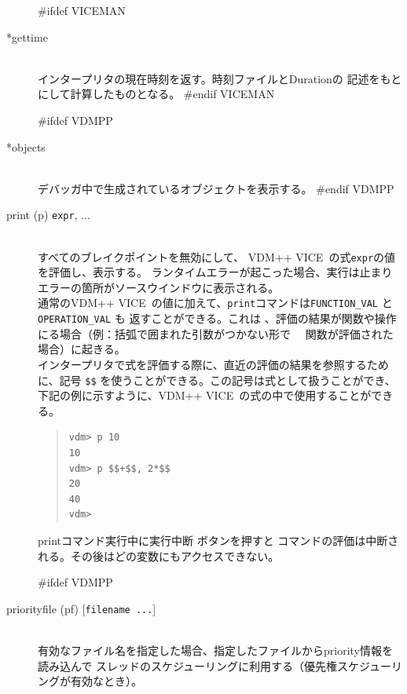 \documentclass[\pformat,12pt]{article}
\newcommand{\vdmslpp}{VDM-SL}
\newcommand{\vdmslpp}{VDM++}
\renewcommand{\vdmslpp}{VDM++ VICE}
\newcommand{\guicmd}[1]{{\sf #1}}
\newcommand{\guicmd}[1]{{\gt #1}}
\begin{document}
\begin{description}
#ifdef VICEMAN
\item[*gettime]\mbox{}\\
  インタープリタの現在時刻を返す。時刻ファイルとDurationの
  記述をもとにして計算したものとなる。
#endif VICEMAN

#ifdef VDMPP
\item[*objects] \mbox{}\\
  デバッガ中で生成されているオブジェクトを表示する。
#endif VDMPP


\item[print (p) {\tt expr}, ...] \mbox{}\\
  すべてのブレイクポイントを無効にして、 \vdmslpp\ の式{\tt expr}の値を評価し、表示する。
  ランタイムエラーが起こった場合、実行は止まりエラーの箇所が\guicmd{ソースウインドウ}に表示される。\\
  
  通常の\vdmslpp\ の値に加えて、{\tt print}コマンドは{\tt FUNCTION\_VAL}  と{\tt OPERATION\_VAL} も
  返すことができる。これは 、評価の結果が関数や操作にる場合（例：括弧で囲まれた引数がつかない形で
　関数が評価された場合）に起きる。\\
  
  インタープリタで式を評価する際に、直近の評価の結果を参照するために、記号
   {\tt \$\$}\index{\$\$} を使うことができる。この記号は式として扱うことができ、
  下記の例に示すように、\vdmslpp\ の式の中で使用することができる。

\begin{quote}
\begin{verbatim}
vdm> p 10
10
vdm> p $$+$$, 2*$$
20
40
vdm> 
\end{verbatim}
\end{quote}

  printコマンド実行中に\guicmd{実行中断} ボタンを押すと
  コマンドの評価は中断される。その後はどの変数にもアクセスできない。
  
#ifdef VDMPP
\item[priorityfile (pf) \mbox{[{\tt filename ...}]}]
  \mbox{}\\
  有効なファイル名を指定した場合、指定したファイルからpriority情報を読み込んで
  スレッドのスケジューリングに利用する（優先権スケジューリングが有効なとき）。\\


\end{description}
\end{document}
